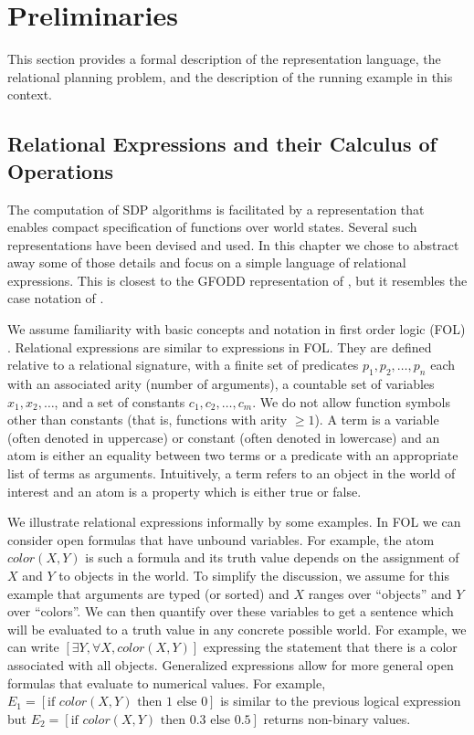 %

\section{Preliminaries}

This section provides a formal description of the representation language, the relational planning problem, and the description of the running example in this context.


%
%
%
%

%
\subsection{Relational Expressions and their Calculus of Operations}

%

The computation of SDP algorithms is facilitated by a representation
that enables compact specification of functions over world
states. Several such representations have been devised and used. In
this chapter we chose to abstract away some of those details and focus
on a simple language of relational expressions. This is closest to the
GFODD representation of \cite{JoshiKeKh11,JoshiKhRaTaFe13}, but it resembles the case
notation of \cite{BoutilierRePr01,SannerBo09}.

%
%
%
%
%
We assume familiarity with basic concepts and notation in  first order logic (FOL) \cite{Lloyd87,RussellNo95,ChangKe90}. 
Relational expressions are similar to expressions in 
FOL. They are defined relative to a relational signature, with a
finite set of predicates $p_1, p_2, \ldots, p_n$ each with an
associated arity (number of arguments), a countable set of variables
$x_1, x_2, \ldots$, and a set of constants $c_1, c_2, \ldots, c_m$. We
do not allow function symbols other than constants (that is, functions
with arity $\geq 1$).  
%
%
A term is a
variable (often denoted in uppercase) or constant (often denoted in lowercase)
and an atom is either an equality between two
terms or a predicate with an appropriate list of terms as arguments.
Intuitively, a term refers to an object in the world of interest and
an atom is a property which is either true or false.

We illustrate relational expressions informally by some examples. In
FOL we can consider open formulas that have unbound variables. For
example, the atom $color(X,Y)$ is such a formula and its truth value
depends on the assignment of $X$ and $Y$ to objects in the world.  To
simplify the discussion, we assume for this example that arguments are
typed (or sorted) and $X$ ranges over ``objects'' and $Y$ over ``colors''.  We can
then quantify over these variables to get a sentence which will be
evaluated to a truth value in any concrete possible world. For
example, we can write $[\exists Y, \forall X, color(X,Y)]$ expressing
the statement that there is a color associated with all objects.
Generalized expressions allow for more general open formulas that
evaluate to numerical values.  For example, $E_1=[\mbox{if }
  color(X,Y) \mbox{ then 1 else 0}]$ is similar to the previous logical
expression but $E_2 =[\mbox{if } color(X,Y) \mbox{ then 0.3 else
    0.5}]$ returns non-binary values.

